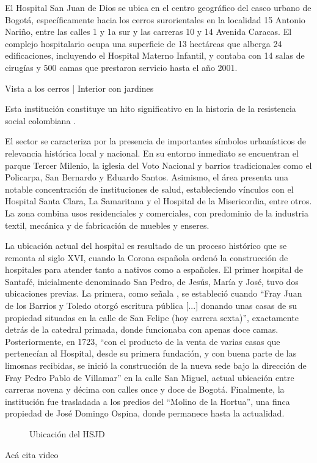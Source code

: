 El Hospital San Juan de Dios se ubica en el centro geográfico del casco urbano de Bogotá, específicamente hacia los cerros surorientales en la localidad 15 Antonio Nariño, entre las calles 1 y 1a sur y las carreras 10 y 14 Avenida Caracas. El complejo hospitalario ocupa una superficie de 13 hectáreas que alberga 24 edificaciones, incluyendo el Hospital Materno Infantil, y contaba con 14 salas de cirugías y 500 camas que prestaron servicio hasta el año 2001. 

Vista a los cerros | Interior con jardines

Esta institución constituye un hito significativo en la historia de la resistencia social colombiana \parencite{Gongora2013}.

El sector se caracteriza por la presencia de importantes símbolos urbanísticos de relevancia histórica local y nacional. En su entorno inmediato se encuentran el parque Tercer Milenio, la iglesia del Voto Nacional y barrios tradicionales como el Policarpa, San Bernardo y Eduardo Santos. Asimismo, el área presenta una notable concentración de instituciones de salud, estableciendo vínculos con el Hospital Santa Clara, La Samaritana y el Hospital de la Misericordia, entre otros. La zona combina usos residenciales y comerciales, con predominio de la industria textil, mecánica y de fabricación de muebles y enseres.

La ubicación actual del hospital es resultado de un proceso histórico que se remonta al siglo XVI, cuando la Corona española ordenó la construcción de hospitales para atender tanto a nativos como a españoles. El primer hospital de Santafé, inicialmente denominado San Pedro, de Jesús, María y José, tuvo dos ubicaciones previas. La primera, como señala \parencite{Romero1994}, se estableció cuando \enquote{Fray Juan de los Barrios y Toledo otorgó escritura pública [...] donando unas casas de su propiedad situadas en la calle de San Felipe (hoy carrera sexta)}, exactamente detrás de la catedral primada, donde funcionaba con apenas doce camas. Posteriormente, en 1723, \enquote{con el producto de la venta de varias casas que pertenecían al Hospital, desde su primera fundación, y con buena parte de las limosnas recibidas, se inició la construcción de la nueva sede bajo la dirección de Fray Pedro Pablo de Villamar} en la calle San Miguel, actual ubicación entre carreras novena y décima con calles once y doce de Bogotá. Finalmente, la institución fue trasladada a los predios del \enquote{Molino de la Hortua}, una finca propiedad de José Domingo Ospina, donde permanece hasta la actualidad.

\begin{figure}[h]
\caption{Ubicación del HSJD}
\label{fig:ubicacion_hsjd}
\end{figure}

Acá cita video \parencite{lauradiaz2016}